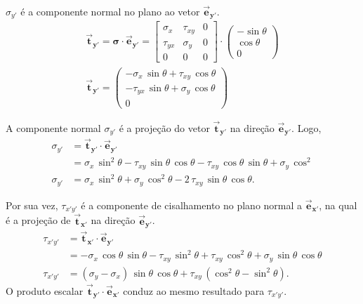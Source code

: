\documentclass[11pt]{article}
\begin{document}
	$\sigma_{y'}$ é a componente normal no plano ao vetor $\boldsymbol{\vec{e}_{y'}}$.
	\begin{gather*}
		\boldsymbol{\vec{t}_{y'}} = \mathbf{\sigma}\cdot \boldsymbol{\vec{e}_{y'}} =
		\begin{bmatrix}
			\sigma_{x} & \tau_{xy} & 0 \\
			\tau_{yx} & \sigma_{y} & 0 \\
			0 & 0 & 0
		\end{bmatrix}
		\cdot
		\begin{pmatrix}
			-\sin \theta \\
			\cos \theta \\
			0
		\end{pmatrix} \\
		\boldsymbol{\vec{t}_{y'}} =
		\begin{pmatrix}
			-\sigma_{x}\, \sin\theta + \tau_{xy}\, \cos\theta \\
			-\tau_{yx}\, \sin \theta + \sigma_{y}\, \cos \theta \\
			0
		\end{pmatrix}
	\end{gather*}

	A componente normal $\sigma_{y'}$ é a projeção do vetor $\boldsymbol{\vec{t}_{y'}}$ na direção $\boldsymbol{\vec{e}_{y'}}$. Logo,
	\begin{align}
		\sigma_{y'} &=\boldsymbol{\vec{t}_{y'}}\cdot \boldsymbol{\vec{e}_{y'}} \nonumber \\
		&=\sigma_{x}\, \sin^2 \theta - \tau_{xy}\, \sin\theta\, \cos\theta - \tau_{xy}\, \cos\theta \, \sin\theta + \sigma_{y}\, \cos^2 \nonumber \\
		\sigma_{y'}&=\sigma_{x}\, \sin^2 \theta + \sigma_{y}\, \cos^2 \theta - 2\, \tau_{xy}\, \sin\theta\, \cos\theta.
		\label{eq:sigma_y}
	\end{align}

	Por sua vez, $\tau_{x'y'}$ é a componente de cisalhamento no plano normal a $\boldsymbol{\vec{e}_{x'}}$, na qual é a projeção de $\boldsymbol{\vec{t}_{x'}}$ na direção $\boldsymbol{\vec{e}_{y'}}$.
	\begin{align}
		\tau_{x'y'} &=\boldsymbol{\vec{t}_{x'}}\cdot \boldsymbol{\vec{e}_{y'}} \nonumber \\
		&= - \sigma_{x}\, \cos\theta\, \sin\theta - \tau_{xy}\, \sin^2 \theta + \tau_{xy}\, \cos^2 \theta + \sigma_{y}\, \sin\theta\, \cos\theta \nonumber \\
		\tau_{x'y'}&=(\sigma_{y}-\sigma_{x})\, \sin\theta\, \cos\theta + \tau_{xy}\, (\cos^2 \theta - \sin^2 \theta).
		\label{eq:tau_xy}
	\end{align}
	O produto escalar $\boldsymbol{\vec{t}_{y'}}\cdot \boldsymbol{\vec{e}_{x'}}$ conduz ao mesmo resultado para $\tau_{x'y'}$.
	
\end{document}

